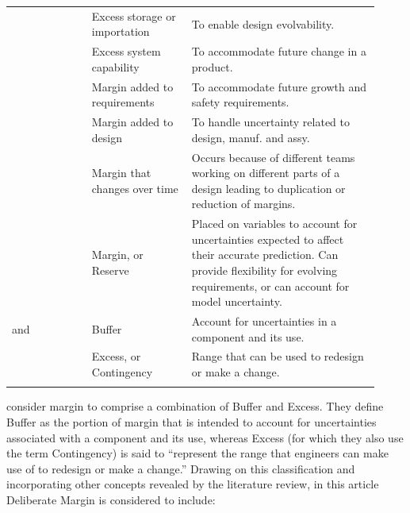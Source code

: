 \begin{table}[]
\begin{tabular}{p{0.2\linewidth}p{0.25\linewidth}p{0.47\linewidth}}
	\cite{Tilstra2015} & Excess storage or importation & To enable design evolvability. \\
	\cite{Watson2016} & Excess system capability & To accommodate future change in a product. \\ 
	
	

		\cite{Eckert2017} & Margin added to requirements & To accommodate future growth and safety requirements. \\ 
	& Margin added to design & To handle uncertainty related to design, manuf. and assy. \\
	& Margin that changes over time & Occurs because of different teams working on different parts of a design leading to duplication or reduction of margins. \\ 
	\cite{Guenov2018} & Margin, or Reserve & Placed on variables to account for uncertainties expected to affect their accurate prediction. Can provide flexibility for evolving requirements, or can account for model uncertainty. \\
	
		
	\cite{lebjioui2018} and \cite{Eckert2019} & Buffer & Account for uncertainties in a component and its use.\\ 
	& Excess, or Contingency & Range that can be used to redesign or make a change.\\
	
		\specialrule{.05em}{.3em}{.3em}
	\end{tabular}
\end{table}


\cite{Eckert2019} consider margin to comprise a combination of Buffer and Excess. They define Buffer as the portion of margin that is intended to account for uncertainties associated with a component and its use, whereas Excess (for which they also use the term Contingency) is said to ``represent the range that engineers can make use of to redesign or make a change.'' Drawing on this classification and incorporating other concepts revealed by the literature review, in this article Deliberate Margin is considered to include:

